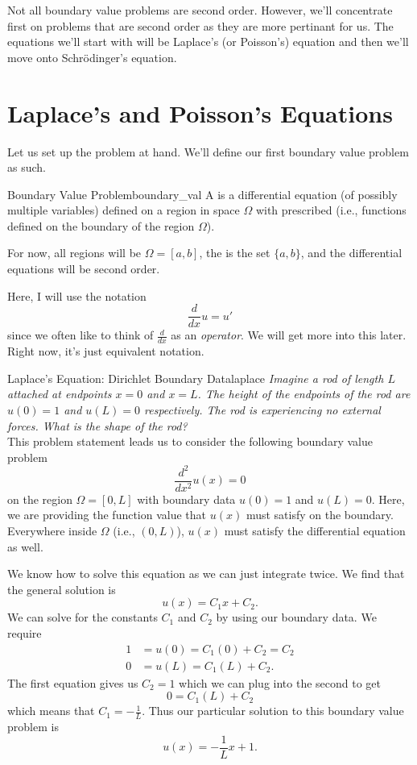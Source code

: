 Not all boundary value problems are second order.  However, we'll concentrate first on problems that are second order as they are more pertinant for us.  The equations we'll start with will be Laplace's (or Poisson's) equation and then we'll move onto Schr\"odinger's equation.

\section{Laplace's and Poisson's Equations}

Let us set up the problem at hand.  We'll define our first boundary value problem as such.
\begin{df}{Boundary Value Problem}{boundary_val}
A  is a differential equation (of possibly multiple variables) defined on a region in space $\Omega$ with prescribed  (i.e., functions defined on the boundary of the region $\Omega$).

For now, all regions will be $\Omega=[a,b]$, the  is the set $\{a,b\}$, and the differential equations will be second order.
\end{df}

\begin{remark}
Here, I will use the notation
\[
\frac{d}{dx}u=u'
\]
since we often like to think of $\frac{d}{dx}$ as an \emph{operator}.  We will get more into this later. Right now, it's just equivalent notation.
\end{remark}

\begin{ex}{Laplace's Equation: Dirichlet Boundary Data}{laplace}
\emph{Imagine a rod of length $L$ attached at endpoints $x=0$ and $x=L$.  The height of the endpoints of the rod are $u(0)=1$ and $u(L)=0$ respectively.  The rod is experiencing no external forces.  What is the shape of the rod?}\\

This problem statement leads us to consider the following boundary value problem
\[
\frac{d^2}{dx^2}u(x)=0
\]
on the region $\Omega = [0,L]$ with boundary data $u(0)=1$ and $u(L)=0$. Here, we are providing the function value that $u(x)$ must satisfy on the boundary.  Everywhere inside $\Omega$ (i.e., $(0,L)$), $u(x)$ must satisfy the differential equation as well.

We know how to solve this equation as we can just integrate twice.  We find that the general solution is
\[
u(x)=C_1 x + C_2.
\]
We can solve for the constants $C_1$ and $C_2$ by using our boundary data. We require
\begin{align*}
    1&=u(0)=C_1(0)+C_2=C_2\\
    0&=u(L)=C_1(L)+C_2.
\end{align*}
The first equation gives us $C_2=1$ which we can plug into the second to get
\[
0=C_1(L)+C_2
\]
which means that $C_1=-\frac{1}{L}$.  Thus our particular solution to this boundary value problem is
\[
\boxed{u(x)=-\frac{1}{L}x+1.}
\]
\end{ex}

